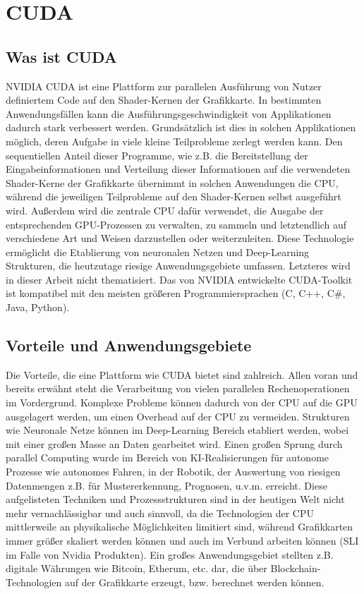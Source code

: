 
\section{CUDA}

\subsection{Was ist CUDA}

NVIDIA CUDA \cite{cuda-zone} ist eine Plattform zur parallelen Ausführung von Nutzer definiertem Code auf den Shader-Kernen der Grafikkarte. In bestimmten Anwendungsfällen kann die Ausführungsgeschwindigkeit von Applikationen dadurch stark verbessert werden.
Grundsätzlich ist dies in solchen Applikationen möglich, deren Aufgabe in viele kleine Teilprobleme zerlegt werden kann. 
Den sequentiellen Anteil dieser Programme, wie z.B. die Bereitstellung der Eingabeinformationen und Verteilung dieser Informationen auf die verwendeten Shader-Kerne der Grafikkarte übernimmt in solchen Anwendungen die CPU, während die jeweiligen Teilprobleme auf den Shader-Kernen selbst ausgeführt wird.
Außerdem wird die zentrale CPU dafür verwendet, die Ausgabe der entsprechenden GPU-Prozessen zu verwalten, zu sammeln und letztendlich auf verschiedene Art und Weisen darzustellen oder weiterzuleiten.
Diese Technologie ermöglicht die Etablierung von neuronalen Netzen und Deep-Learning Strukturen, die heutzutage riesige Anwendungsgebiete umfassen. Letzteres wird in dieser Arbeit nicht thematisiert.
Das von NVIDIA entwickelte CUDA-Toolkit ist kompatibel mit den meisten größeren Programmiersprachen (C, C++, C\#, Java, Python).

\subsection{Vorteile und Anwendungsgebiete}
Die Vorteile, die eine Plattform wie CUDA bietet sind zahlreich. Allen voran und bereits erwähnt steht die Verarbeitung von vielen parallelen Rechenoperationen im Vordergrund. Komplexe Probleme können dadurch von der CPU auf die GPU ausgelagert werden, um einen Overhead auf der CPU zu vermeiden. Strukturen wie Neuronale Netze können im Deep-Learning Bereich etabliert werden, wobei mit einer großen Masse an Daten gearbeitet wird. Einen großen Sprung durch parallel Computing wurde im Bereich von KI-Realisierungen für autonome Prozesse wie autonomes Fahren, in der Robotik, der Auswertung von riesigen Datenmengen z.B. für Mustererkennung, Prognosen, u.v.m. erreicht. Diese aufgelisteten Techniken und Prozessstrukturen sind in der heutigen Welt nicht mehr vernachlässigbar und auch sinnvoll, da die Technologien der CPU mittlerweile an physikalische Möglichkeiten limitiert sind, während Grafikkarten immer größer skaliert werden können und auch im Verbund arbeiten können (SLI im Falle von Nvidia Produkten). Ein großes Anwendungsgebiet stellten z.B. digitale Währungen wie Bitcoin, Etherum, etc. dar, die über Blockchain-Technologien auf der Grafikkarte erzeugt, bzw. berechnet werden können. 

